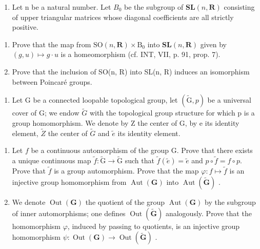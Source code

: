 \begin{enumerate}
\def\labelenumi{\arabic{enumi})}
\setcounter{enumi}{3}
\tightlist
\item
  Let n be a natural number. Let \(B_{0}\) be the subgroup of \(\mathbf{SL}(n,\mathbf{R})\) consisting of upper triangular matrices whose diagonal coefficients are all strictly positive.
\end{enumerate}

\begin{enumerate}
\def\labelenumi{\alph{enumi})}
\item
  Prove that the map from \(\mathrm{SO}(n,\mathbf{R})\times\mathrm{B}_{0}\) into \(\mathbf{SL}(n,\mathbf{R})\) given by \((g,u)\mapsto g\cdot u\) is a homeomorphism (cf. INT, VII, p. 91, prop. 7).
\item
  Prove that the inclusion of SO(n, R) into SL(n, R) induces an isomorphism between Poincaré groups.
\end{enumerate}

\begin{enumerate}
\def\labelenumi{\arabic{enumi})}
\setcounter{enumi}{4}
\tightlist
\item
  Let G be a connected loopable topological group, let \((\widetilde{\mathrm{G}}, p)\) be a universal cover of G; we endow \(\widetilde{G}\) with the topological group structure for which p is a group homomorphism. We denote by Z the center of G, by e its identity element, \(\widetilde{Z}\) the center of \(\widetilde{G}\) and \(\widetilde{e}\) its identity element.
\end{enumerate}

\begin{enumerate}
\def\labelenumi{\alph{enumi})}
\item
  Let \(f\) be a continuous automorphism of the group G. Prove that there exists a unique continuous map \(\widetilde{f} \colon \widetilde{\mathrm{G}} \to \widetilde{\mathrm{G}}\) such that \(\widetilde{f}(\widetilde{e}) = \widetilde{e}\) and \(p \circ \widetilde{f} = f \circ p\). Prove that \(\widetilde{f}\) is a group automorphism. Prove that the map \(\varphi \colon f \mapsto \widetilde{f}\) is an injective group homomorphism from \(\operatorname{Aut}(\mathbf{G})\) into \(\operatorname{Aut}(\widetilde{\mathbf{G}})\) .
\item
  We denote \(\operatorname{Out}(\mathbf{G})\) the quotient of the group \(\operatorname{Aut}(\mathbf{G})\) by the subgroup of inner automorphisms; one defines \(\operatorname{Out}(\widetilde{\mathbf{G}})\) analogously. Prove that the homomorphism \(\varphi\), induced by passing to quotients, is an injective group homomorphism \(\psi\colon\operatorname{Out}(\mathbf{G})\to\operatorname{Out}(\widetilde{\mathbf{G}})\) .
\end{enumerate}

